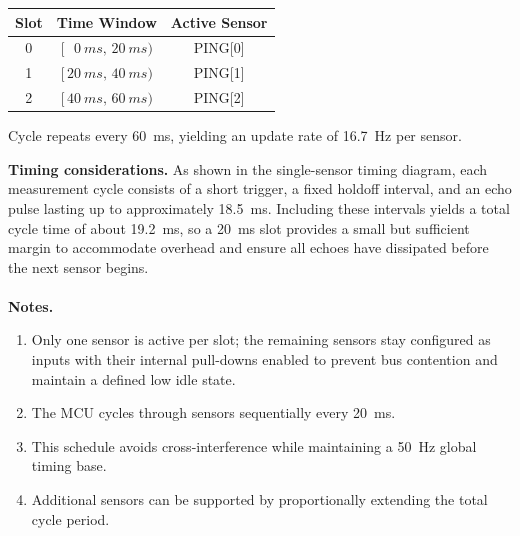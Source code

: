 \documentclass[12pt]{article}
\begin{document}
\vspace{6pt}
\begin{center}
\renewcommand{\arraystretch}{1.15}
\begin{tabular}{ccc}
\toprule
\textbf{Slot} & \textbf{Time Window} & \textbf{Active Sensor} \\
\midrule
0 & $[\,\,\,\,\SI{0}{ms},\,\SI{20}{ms})$   & PING[0] \\
1 & $[\,\SI{20}{ms},\,\SI{40}{ms})$  & PING[1] \\
2 & $[\,\SI{40}{ms},\,\SI{60}{ms})$  & PING[2] \\
\bottomrule
\end{tabular}

\vspace{3pt}
\footnotesize
Cycle repeats every \SI{60}{ms}, yielding an update rate of \SI{16.7}{Hz} per sensor.
\end{center}
\vspace{6pt}
\noindent\textbf{Timing considerations.}
As shown in the single-sensor timing diagram, each measurement cycle consists of a short trigger, a fixed holdoff interval, and an echo pulse lasting up to approximately \SI{18.5}{ms}. Including these intervals yields a total cycle time of about \SI{19.2}{ms}, so a \SI{20}{ms} slot provides a small but sufficient margin to accommodate overhead and ensure all echoes have dissipated before the next sensor begins.\\
\\
\noindent\textbf{Notes.}
\begin{enumerate}
  \item Only one sensor is active per slot; the remaining sensors stay configured as inputs with their internal pull-downs enabled to prevent bus contention and maintain a defined low idle state. 
  \item The MCU cycles through sensors sequentially every \SI{20}{ms}.
  \item This schedule avoids cross-interference while maintaining a \SI{50}{Hz} global timing base.
  \item Additional sensors can be supported by proportionally extending the total cycle period.
\end{enumerate}
\end{document}
